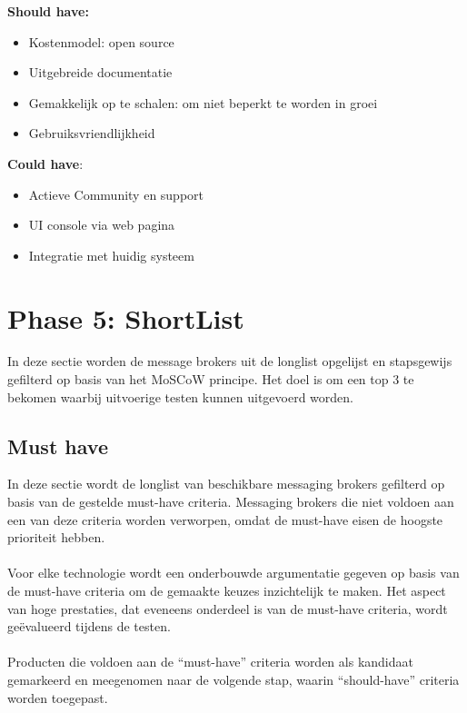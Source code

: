 \textbf{Should have:}
\begin{itemize}
  \item Kostenmodel: open source 
  \item Uitgebreide documentatie
  \item Gemakkelijk op te schalen: om niet beperkt te worden in groei
  \item Gebruiksvriendlijkheid
\end{itemize}

\textbf{Could have}:
\begin{itemize}
  \item Actieve Community en support
  \item UI console via web pagina
  \item Integratie met huidig systeem
\end{itemize}

\newpage
\section{Phase 5: ShortList}
In deze sectie worden de message brokers uit de longlist opgelijst en stapsgewijs gefilterd op basis van het MoSCoW principe.
Het doel is om een top 3 te bekomen waarbij uitvoerige testen kunnen uitgevoerd worden.

\subsection{Must have}
In deze sectie wordt de longlist van beschikbare messaging brokers gefilterd op basis van de gestelde must-have criteria. 
Messaging brokers die niet voldoen aan een van deze criteria worden verworpen, omdat de must-have eisen de hoogste prioriteit hebben.
\\\\
Voor elke technologie wordt een onderbouwde argumentatie gegeven op basis van de must-have criteria om de gemaakte keuzes inzichtelijk te maken. 
Het aspect van hoge prestaties, dat eveneens onderdeel is van de must-have criteria, wordt geëvalueerd tijdens de testen.
\\\\
Producten die voldoen aan de ``must-have'' criteria worden als kandidaat gemarkeerd en meegenomen naar de volgende stap, waarin ``should-have'' criteria worden toegepast.
 
